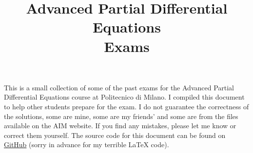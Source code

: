 \documentclass[a4paper,12pt]{article}
\theoremstyle{break}
\numberwithin{equation}{section}
\begin{document}
\title{Advanced Partial Differential Equations \\ Exams}
\author{}
\date{}
\maketitle
This is a small collection of some of the past exams for the Advanced Partial Differential Equations course at Politecnico di Milano. I compiled this document to help other students prepare for the exam. I do not guarantee the correctness of the solutions, some are mine, some are my friends' and some are from the files available on the AIM website. If you find any mistakes, please let me know or correct them yourself. The source code for this document can be found on \href{https://github.com/itsmebonny/LaTeX/tree/main/APDE}{GitHub} (sorry in advance for my terrible LaTeX code).
\end{document}
